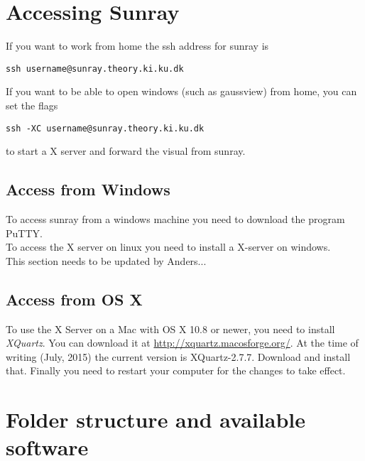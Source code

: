 \documentclass{article}
\begin{document}
\newpage
\section{Accessing Sunray}

If you want to work from home the ssh address for sunray is

\begin{lstlisting}
ssh username@sunray.theory.ki.ku.dk
\end{lstlisting}

If you want to be able to open windows (such as gaussview) from home, you can set the flags

\begin{lstlisting}
ssh -XC username@sunray.theory.ki.ku.dk
\end{lstlisting}

to start a X server and forward the visual from sunray.




\subsection{Access from Windows}

To access sunray from a windows machine you need to download the program PuTTY.\\

To access the X server on linux you need to install a X-server on windows.\\

This section needs to be updated by Anders...


\subsection{Access from OS X}

To use the X Server on a Mac with OS X 10.8 or newer, you need to install \emph{XQuartz}.
You can download it at \url{http://xquartz.macosforge.org/}.
At the time of writing (July, 2015) the current version is XQuartz-2.7.7.
Download and install that.
Finally you need to restart your computer for the changes to take effect.



\newpage
\section{Folder structure and available software}
\end{document}
